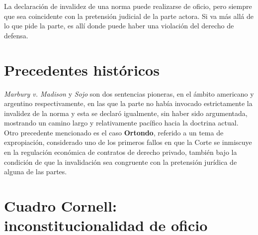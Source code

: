 \documentclass[12pt,oneside]{book}
\begin{document}
\begin{important}
La declaración de invalidez de una norma puede realizarse de oficio, pero siempre que sea coincidente con la pretensión judicial de la parte actora. Si va más allá de lo que pide la parte, es allí donde puede haber una violación del derecho de defensa.
\end{important}

\section{Precedentes históricos}

\emph{Marbury v. Madison} y \emph{Sojo} son dos sentencias pioneras, en el ámbito americano y argentino respectivamente, en las que la parte no había invocado estrictamente la invalidez de la norma y esta se declaró igualmente, sin haber sido argumentada, mostrando un camino largo y relativamente pacífico hacia la doctrina actual. Otro precedente mencionado es el caso \textbf{Ortondo}, referido a un tema de expropiación, considerado uno de los primeros fallos en que la Corte se inmiscuye en la regulación económica de contratos de derecho privado, también bajo la condición de que la invalidación sea congruente con la pretensión jurídica de alguna de las partes.

\section{Cuadro Cornell: inconstitucionalidad de oficio}
\end{document}
